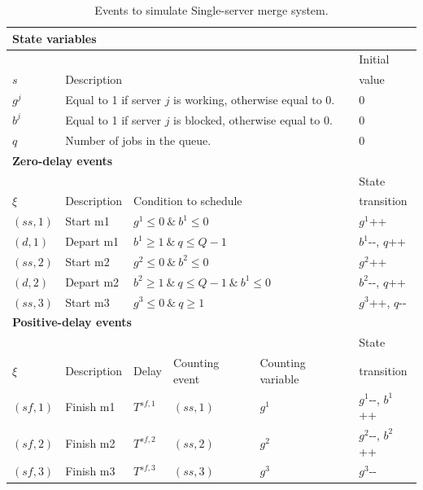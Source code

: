 \documentclass[]{interact}
\theoremstyle{plain}%
\theoremstyle{definition}
\theoremstyle{remark}
\begin{document}
\begin{table}[h]
	\begin{tabular}{llllll} 
		\multicolumn{6}{l}{\textbf{State variables}}\\ \hline
				 &&&&& Initial\\
		$s$ & \multicolumn{4}{l}{Description}& value\\\hline
		$g^{j}$&\multicolumn{4}{l}{Equal to 1 if server $j$ is working, otherwise equal to 0.}&0\\
		$b^{j}$&\multicolumn{4}{l}{Equal to 1 if server $j$ is blocked, otherwise equal to 0.}&0\\
		$q$&\multicolumn{4}{l}{Number of jobs in the queue.}&0\\
		\multicolumn{6}{l}{\textbf{Zero-delay events}}\\ \hline
				 &&&&& State\\
		$\xi$&Description &  \multicolumn{3}{l}{Condition to schedule}& transition\\\hline
		$({ss,1})$ & Start m1 &  \multicolumn{3}{l}{$g^1\le 0\ \&\ b^1\le0 $} & $g^1${\footnotesize++} \\
		$({d,1})$&Depart m1&  \multicolumn{3}{l}{$b^1\ge1\ \&\  q\le Q-1$} &$b^1${\small-}{\small-}, $q${\footnotesize++} \\
		$({ss,2})$& Start m2 &  \multicolumn{3}{l}{$g^2\le 0\ \&\ b^2\le0 $} & $g^2${\footnotesize++} \\
		$({d,2})$&Depart m2&\multicolumn{3}{l}{$b^2\ge1\ \&\ q\le Q-1\ \&\ b^1\le 0$}&  $b^2${\small-}{\small-}, $q${\footnotesize++} \\
		$({ss,3})$ & Start m3 & \multicolumn{3}{l}{$g^3 \le 0\ \&\ q\ge 1$}&$g^3${\footnotesize++}, $q${\small-}{\small-} \\
		\multicolumn{6}{l}{\textbf{Positive-delay events}}\\ \hline
				&&& &  & State \\
		$\xi$&Description & Delay &  Counting event& Counting variable & transition\\\hline
		$({sf,1})$&Finish m1 & $T^{sf,1}$& ${(ss,1)}$&  $g^1$&  $g^1${\small-}{\small-}, $b^1${\footnotesize++}\\	
		$({sf,2})$&Finish m2 & $T^{sf,2}$& ${(ss,2)}$&  $g^2$&  $g^2${\small-}{\small-}, $b^2${\footnotesize++}\\	
		$({sf,3})$&Finish m3 & $T^{sf,3}$& ${(ss,3)}$&  $g^3$&  $g^3${\small-}{\small-}\\	\hline
	\end{tabular}
	\caption{Events to simulate Single-server merge system.}
	\label{tab:merge}
\end{table}
\end{document}
